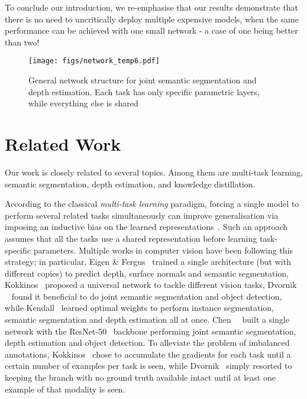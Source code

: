 \documentclass[letterpaper, 10 pt, conference]{ieeeconf}
\begin{document}
To conclude our introduction, we re-emphasise that our results demonstrate that there is no need to uncritically deploy multiple expensive models, when the same performance can be achieved with one small network - a case of one being better than two!

\begin{figure*}
	\centering
	\texttt{[image: figs/network\_temp6.pdf]}
	\caption{General network structure for joint semantic segmentation and depth estimation. Each task has only  specific parametric layers, while everything else is shared}
	\label{fig:arch}
	\vskip -0.2in
\end{figure*}

\section{Related Work}
\label{sec:rel_work}

Our work is closely related to several topics. Among them are multi-task learning, semantic segmentation, depth estimation, and knowledge distillation.

According to the classical {\em multi-task learning} paradigm, forcing a single model to perform several related tasks simultaneously can improve generalisation via imposing an inductive bias on the learned representations~\cite{Caruana93,Baxter00}. Such an approach assumes that all the tasks use a shared representation before learning task-specific parameters. Multiple works in computer vision have been following this strategy; in particular, Eigen \& Fergus~\cite{EigenF15} trained a single architecture (but with different copies) to predict depth, surface normals and semantic segmentation, Kokkinos~\cite{Kokkinos17} proposed a universal network to tackle  different vision tasks, Dvornik ~\etal\cite{DvornikSMS17} found it beneficial to do joint semantic segmentation and object detection, while Kendall~\etal\cite{KendallGC17} learned optimal weights to perform instance segmentation, semantic segmentation and depth estimation all at once. Chen~\etal~\cite{ChenYML18} built a single network with the ResNet-50~\cite{HeZRS16} backbone performing joint semantic segmentation, depth estimation and object detection. To alleviate the problem of imbalanced annotations, Kokkinos~\cite{Kokkinos17} chose to accumulate the gradients for each task until a certain number of examples per task is seen, while Dvornik~\etal \cite{DvornikSMS17} simply resorted to keeping the branch with no ground truth available intact until at least one example of that modality is seen.
\end{document}
